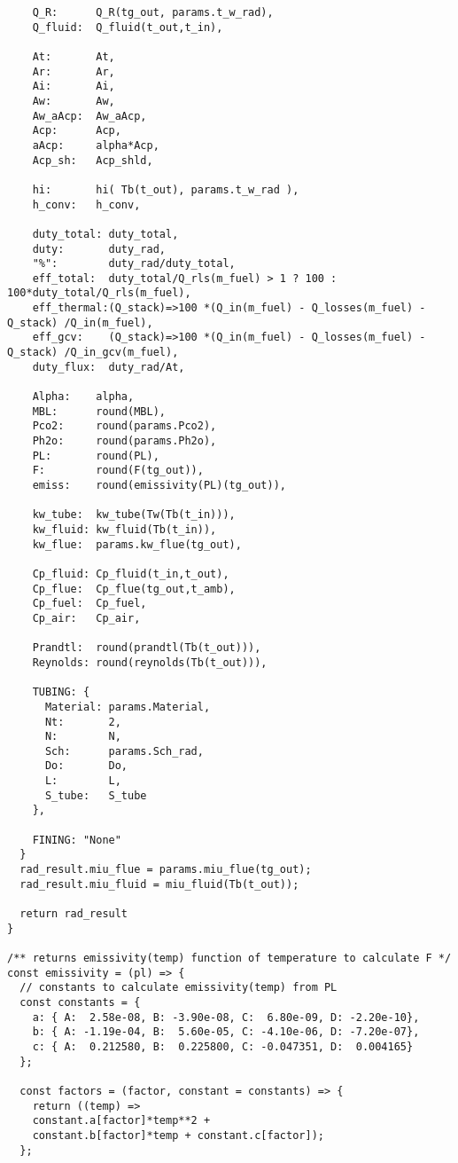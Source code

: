\begin{verbatim}
    Q_R:      Q_R(tg_out, params.t_w_rad),
    Q_fluid:  Q_fluid(t_out,t_in),

    At:       At,
    Ar:       Ar,
    Ai:       Ai,
    Aw:       Aw,
    Aw_aAcp:  Aw_aAcp,
    Acp:      Acp,
    aAcp:     alpha*Acp,
    Acp_sh:   Acp_shld,

    hi:       hi( Tb(t_out), params.t_w_rad ),
    h_conv:   h_conv,

    duty_total: duty_total,
    duty:       duty_rad,
    "%":        duty_rad/duty_total,
    eff_total:  duty_total/Q_rls(m_fuel) > 1 ? 100 : 100*duty_total/Q_rls(m_fuel),
    eff_thermal:(Q_stack)=>100 *(Q_in(m_fuel) - Q_losses(m_fuel) - Q_stack) /Q_in(m_fuel),
    eff_gcv:    (Q_stack)=>100 *(Q_in(m_fuel) - Q_losses(m_fuel) - Q_stack) /Q_in_gcv(m_fuel),
    duty_flux:  duty_rad/At,

    Alpha:    alpha,
    MBL:      round(MBL),
    Pco2:     round(params.Pco2),
    Ph2o:     round(params.Ph2o),
    PL:       round(PL),
    F:        round(F(tg_out)),
    emiss:    round(emissivity(PL)(tg_out)),

    kw_tube:  kw_tube(Tw(Tb(t_in))),
    kw_fluid: kw_fluid(Tb(t_in)),
    kw_flue:  params.kw_flue(tg_out),

    Cp_fluid: Cp_fluid(t_in,t_out),
    Cp_flue:  Cp_flue(tg_out,t_amb),
    Cp_fuel:  Cp_fuel,
    Cp_air:   Cp_air,

    Prandtl:  round(prandtl(Tb(t_out))),
    Reynolds: round(reynolds(Tb(t_out))),

    TUBING: {
      Material: params.Material,
      Nt:       2,
      N:        N,
      Sch:      params.Sch_rad,
      Do:       Do,
      L:        L,
      S_tube:   S_tube
    },
    
    FINING: "None"
  }
  rad_result.miu_flue = params.miu_flue(tg_out);
  rad_result.miu_fluid = miu_fluid(Tb(t_out));
  
  return rad_result
}

/** returns emissivity(temp) function of temperature to calculate F */
const emissivity = (pl) => {
  // constants to calculate emissivity(temp) from PL
  const constants = {
    a: { A:  2.58e-08, B: -3.90e-08, C:  6.80e-09, D: -2.20e-10},
    b: { A: -1.19e-04, B:  5.60e-05, C: -4.10e-06, D: -7.20e-07},
    c: { A:  0.212580, B:  0.225800, C: -0.047351, D:  0.004165}
  };

  const factors = (factor, constant = constants) => {
    return ((temp) => 
    constant.a[factor]*temp**2 + 
    constant.b[factor]*temp + constant.c[factor]);
  };


\end{verbatim}
